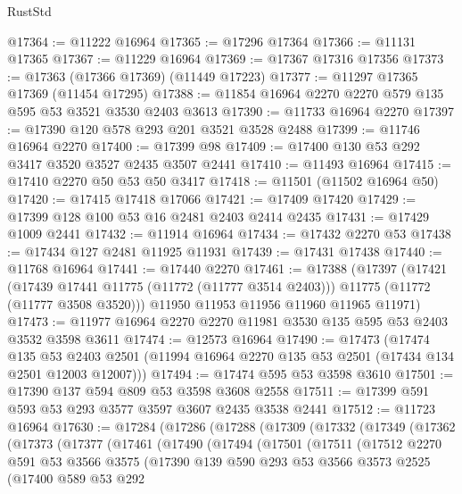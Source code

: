 \begin{lexlean}{RustStd}
\begin{coremodule}
@17364 := @11222 @16964
@17365 := @17296 @17364
@17366 := @11131 @17365
@17367 := @11229 @16964
@17369 := @17367 @17316 @17356
@17373 := @17363 (@17366 @17369) (@11449 @17223)
@17377 := @11297 @17365 @17369 (@11454 @17295)
@17388 := @11854 @16964 @2270 @2270 @579 @135 @595 @53 @3521 @3530 @2403 @3613
@17390 := @11733 @16964 @2270
@17397 := @17390 @120 @578 @293 @201 @3521 @3528 @2488
@17399 := @11746 @16964 @2270
@17400 := @17399 @98
@17409 := @17400 @130 @53 @292 @3417 @3520 @3527 @2435 @3507 @2441
@17410 := @11493 @16964
@17415 := @17410 @2270 @50 @53 @50 @3417
@17418 := @11501 (@11502 @16964 @50)
@17420 := @17415 @17418 @17066
@17421 := @17409 @17420
@17429 := @17399 @128 @100 @53 @16 @2481 @2403 @2414 @2435
@17431 := @17429 @1009 @2441
@17432 := @11914 @16964
@17434 := @17432 @2270 @53
@17438 := @17434 @127 @2481 @11925 @11931
@17439 := @17431 @17438
@17440 := @11768 @16964
@17441 := @17440 @2270
@17461 := @17388
    (@17397
      (@17421
        (@17439 @17441 @11775 (@11772 (@11777 @3514 @2403)))
        @11775
        (@11772 (@11777 @3508 @3520)))
      @11950
      @11953
      @11956
      @11960
      @11965
      @11971)
@17473 := @11977 @16964 @2270 @2270 @11981 @3530 @135 @595 @53 @2403 @3532 @3598 @3611
@17474 := @12573 @16964
@17490 := @17473
    (@17474
      @135
      @53
      @2403
      @2501
      (@11994 @16964 @2270 @135 @53 @2501 (@17434 @134 @2501 @12003 @12007)))
@17494 := @17474 @595 @53 @3598 @3610
@17501 := @17390 @137 @594 @809 @53 @3598 @3608 @2558
@17511 := @17399 @591 @593 @53 @293 @3577 @3597 @3607 @2435 @3538 @2441
@17512 := @11723 @16964
@17630 := @17284
    (@17286
      (@17288
        (@17309
          (@17332
            (@17349
              (@17362
                (@17373
                  (@17377
                    (@17461
                      (@17490
                        (@17494
                          (@17501
                            (@17511
                              (@17512
                                @2270
                                @591
                                @53
                                @3566
                                @3575
                                (@17390
                                  @139
                                  @590
                                  @293
                                  @53
                                  @3566
                                  @3573
                                  @2525
                                  (@17400
                                    @589
                                    @53
                                    @292

\end{coremodule}
\end{lexlean}
